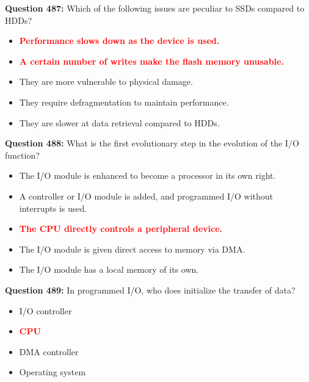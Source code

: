 \documentclass[12pt,a4paper]{article}
\begin{document}
\vspace{0.5cm}

\textbf{Question 487:} Which of the following issues are peculiar to SSDs compared to HDDs?

\begin{itemize}
    \item[\textbf{A.}] \textcolor{red}{\textbf{Performance slows down as the device is used.}}
    \item[\textbf{B.}] \textcolor{red}{\textbf{A certain number of writes make the flash memory unusable.}}
    \item[\textbf{C.}] They are more vulnerable to physical damage.
    \item[\textbf{D.}] They require defragmentation to maintain performance.
    \item[\textbf{E.}] They are slower at data retrieval compared to HDDs.
\end{itemize}

\vspace{0.5cm}

\textbf{Question 488:} What is the first evolutionary step in the evolution of the I/O function?

\begin{itemize}
    \item[\textbf{A.}] The I/O module is enhanced to become a processor in its own right.
    \item[\textbf{B.}] A controller or I/O module is added, and programmed I/O without interrupts is used.
    \item[\textbf{C.}] \textcolor{red}{\textbf{The CPU directly controls a peripheral device.}}
    \item[\textbf{D.}] The I/O module is given direct access to memory via DMA.
    \item[\textbf{E.}] The I/O module has a local memory of its own.
\end{itemize}

\vspace{0.5cm}

\textbf{Question 489:} In programmed I/O, who does initialize the transfer of data?

\begin{itemize}
    \item[\textbf{A.}] I/O controller
    \item[\textbf{B.}] \textcolor{red}{\textbf{CPU}}
    \item[\textbf{C.}] DMA controller
    \item[\textbf{D.}] Operating system
\end{itemize}
\end{document}
